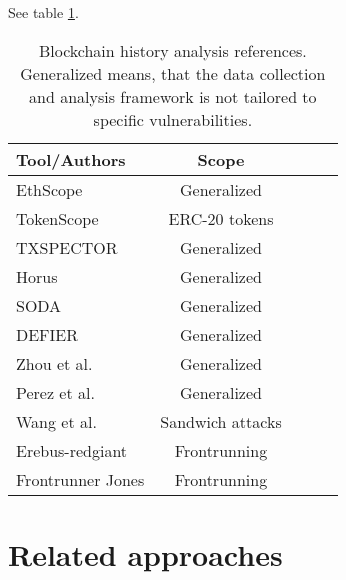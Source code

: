 \documentclass[draft,final]{vutinfth} %
\begin{document}
See table \ref{tab:blockchain_history_analyzers}.




\begin{table}[h]
    \begin{center}
        \begin{tabular}{ | l | c  | c | c | c | }
            \hline
            Tool/Authors                                     & Scope            \\ \hline
            EthScope \cite{wu_time-travel_2022}              & Generalized      \\ \hline
            TokenScope \cite{chen_tokenscope_2019}           & ERC-20 tokens    \\ \hline
            TXSPECTOR \cite{zhang_txspector_2020}            & Generalized      \\ \hline
            Horus \cite{ferreira_torres_eye_2021}            & Generalized      \\ \hline
            SODA \cite{chen_soda_2020}                       & Generalized      \\ \hline
            DEFIER \cite{su_evil_2021}                       & Generalized      \\ \hline
            Zhou et al. \cite{zhou_ever-evolving_2020}       & Generalized      \\ \hline
            Perez et al. \cite{perez_smart_2021}             & Generalized      \\ \hline
            Wang et al. \cite{wang_impact_2022}              & Sandwich attacks \\ \hline
            Erebus-redgiant \cite{zhang_combatting_2023}     & Frontrunning     \\ \hline
            Frontrunner Jones \cite{torres_frontrunner_2021} & Frontrunning     \\ \hline
        \end{tabular}
        \caption{Blockchain history analysis references. Generalized means, that the data collection and analysis framework is not tailored to specific vulnerabilities.}
        \label{tab:blockchain_history_analyzers}
    \end{center}
\end{table}

\section{Related approaches}
\end{document}
